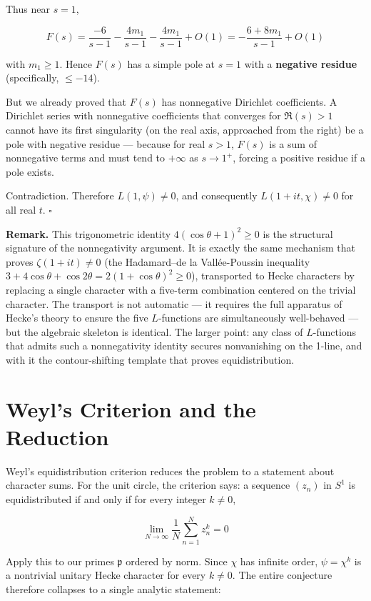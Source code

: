 \documentclass[12pt,a4paper]{article}
\begin{document}
Thus near $s=1$,

\[
F(s) = \frac{-6}{s-1} - \frac{4m_1}{s-1} - \frac{4m_1}{s-1} + O(1) = -\frac{6 + 8m_1}{s-1} + O(1)
\]

with $m_1 \geq 1$. Hence $F(s)$ has a simple pole at $s=1$ with a \textbf{negative residue} (specifically, $\leq -14$).

But we already proved that $F(s)$ has nonnegative Dirichlet coefficients. A Dirichlet series with nonnegative coefficients that converges for $\Re(s) > 1$ cannot have its first singularity (on the real axis, approached from the right) be a pole with negative residue --- because for real $s > 1$, $F(s)$ is a sum of nonnegative terms and must tend to $+\infty$ as $s \to 1^+$, forcing a positive residue if a pole exists.

Contradiction. Therefore $L(1, \psi) \neq 0$, and consequently $L(1+it, \chi) \neq 0$ for all real $t$. $\square$

\textbf{Remark.} This trigonometric identity $4(\cos\theta + 1)^2 \geq 0$ is the structural signature of the nonnegativity argument. It is exactly the same mechanism that proves $\zeta(1+it) \neq 0$ (the Hadamard--de la Vallée-Poussin inequality $3 + 4\cos\theta + \cos 2\theta = 2(1+\cos\theta)^2 \geq 0$), transported to Hecke characters by replacing a single character with a five-term combination centered on the trivial character. The transport is not automatic --- it requires the full apparatus of Hecke's theory to ensure the five $L$-functions are simultaneously well-behaved --- but the algebraic skeleton is identical. The larger point: any class of $L$-functions that admits such a nonnegativity identity secures nonvanishing on the 1-line, and with it the contour-shifting template that proves equidistribution.

\section{Weyl's Criterion and the Reduction}

Weyl's equidistribution criterion reduces the problem to a statement about character sums. For the unit circle, the criterion says: a sequence $(z_n)$ in $S^1$ is equidistributed if and only if for every integer $k \neq 0$,

\[
\lim_{N \to \infty} \frac{1}{N} \sum_{n=1}^N z_n^k = 0
\]

Apply this to our primes $\mathfrak{p}$ ordered by norm. Since $\chi$ has infinite order, $\psi = \chi^k$ is a nontrivial unitary Hecke character for every $k \neq 0$. The entire conjecture therefore collapses to a single analytic statement:
\end{document}
